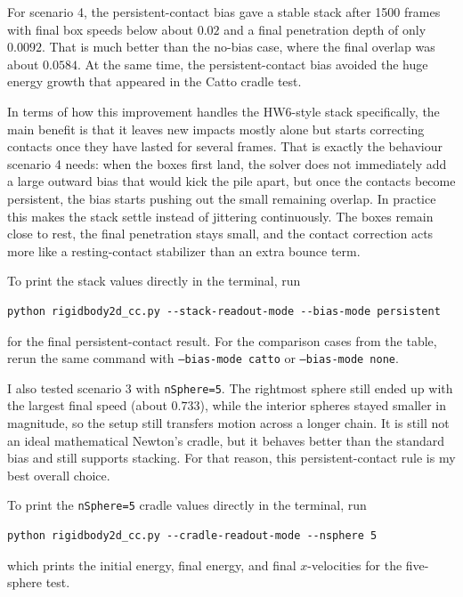 \documentclass[11pt]{article}
\begin{document}
For scenario 4, the persistent-contact bias gave a stable stack after 1500 frames with final box speeds below about $0.02$ and a final penetration depth of only $0.0092$. That is much better than the no-bias case, where the final overlap was about $0.0584$. At the same time, the persistent-contact bias avoided the huge energy growth that appeared in the Catto cradle test.

In terms of how this improvement handles the HW6-style stack specifically, the main benefit is that it leaves new impacts mostly alone but starts correcting contacts once they have lasted for several frames. That is exactly the behaviour scenario 4 needs: when the boxes first land, the solver does not immediately add a large outward bias that would kick the pile apart, but once the contacts become persistent, the bias starts pushing out the small remaining overlap. In practice this makes the stack settle instead of jittering continuously. The boxes remain close to rest, the final penetration stays small, and the contact correction acts more like a resting-contact stabilizer than an extra bounce term.

To print the stack values directly in the terminal, run
\begin{verbatim}
python rigidbody2d_cc.py --stack-readout-mode --bias-mode persistent
\end{verbatim}
for the final persistent-contact result. For the comparison cases from the table, rerun the same command with \texttt{--bias-mode catto} or \texttt{--bias-mode none}.

I also tested scenario 3 with \texttt{nSphere=5}. The rightmost sphere still ended up with the largest final speed (about $0.733$), while the interior spheres stayed smaller in magnitude, so the setup still transfers motion across a longer chain. It is still not an ideal mathematical Newton's cradle, but it behaves better than the standard bias and still supports stacking. For that reason, this persistent-contact rule is my best overall choice.

To print the \texttt{nSphere=5} cradle values directly in the terminal, run
\begin{verbatim}
python rigidbody2d_cc.py --cradle-readout-mode --nsphere 5
\end{verbatim}
which prints the initial energy, final energy, and final $x$-velocities for the five-sphere test.
\end{document}
